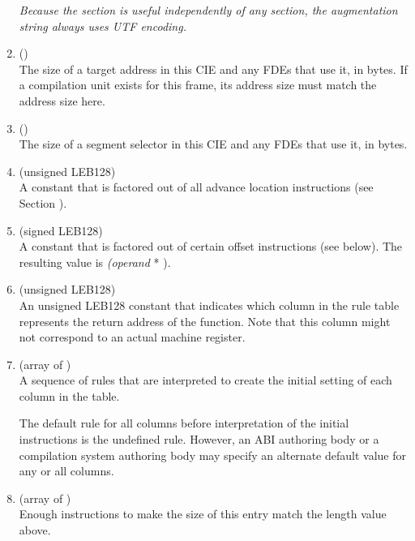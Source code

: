 \begin{enumerate}[1. ]
\textit{Because the \dotdebugframe{} section is useful independently of
any \dotdebuginfo{} section, the augmentation string always uses
UTF encoding.}

\item \HFNaddresssize{} (\HFTubyte) \\
The size of a target address in this CIE and any FDEs that
use it, in bytes. If a compilation unit exists for this frame,
its address size must match the address size here.

\item \HFNsegmentselectorsize{} (\HFTubyte) \\
The size of a segment selector in this CIE and any FDEs that
use it, in bytes.

\item \HFNcodealignmentfactor{} (unsigned LEB128) 
 \\
A 
constant that is factored out of all advance location
instructions (see 
Section ).


\item  \HFNdataalignmentfactor{} (signed LEB128)
 \\
A 
constant that is factored out of certain offset instructions
(see below). The resulting value is  \textit{(operand} *
\HFNdataalignmentfactor).

\item  \HFNreturnaddressregister{} (unsigned LEB128) \\
An unsigned LEB128 constant that indicates which column in the
rule table represents the return address of the function. Note
that this column might not correspond to an actual machine
register.

\item \HFNinitialinstructions{} (array of \HFTubyte) \\
A sequence of rules that are interpreted to create the initial
setting of each column in the table.  

The default rule for
all columns before interpretation of the initial instructions
is the undefined rule. However, an ABI authoring body or a
compilation system authoring body may specify an alternate
default value for any or all columns.

\item \HFNpadding{} (array of \HFTubyte) \\
Enough \DWCFAnop{} instructions to make the size of this entry
match the length value above.
\end{enumerate}

